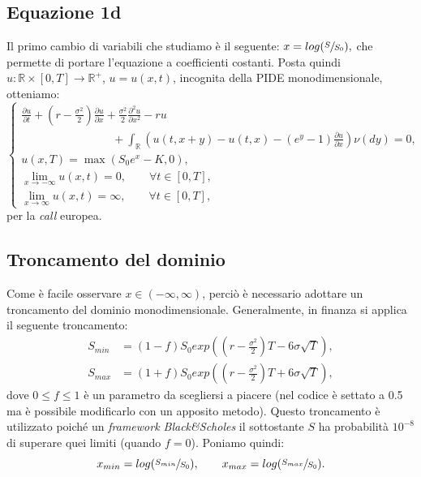 \documentclass[a4paper,10pt]{report}
\newcommand{\der}[2]{\frac{\partial #1}{\partial #2}}
\newcommand{\dder}[2]{\frac{\partial^2 #1}{\partial #2^2}}
\theoremstyle{plain}
\theoremstyle{definition}
\theoremstyle{remark}
\begin{document}
\subsection{Equazione 1d}
Il primo cambio di variabili che studiamo \`e il seguente: $x=log(\sfrac{S}{S_0}),$ che permette di portare l'equazione a coefficienti costanti. Posta quindi $u: \mathbb{R}\times[0,T]\rightarrow\mathbb{R}^+$, $u=u(x,t)$, incognita della PIDE monodimensionale, otteniamo:
\begin{equation}
\label{eq:pide1dlog}
\begin{cases}
\displaystyle
\der{u}{t}+\left(r-\frac{\sigma^2}{2}\right)\der{u}{x}+\frac{\sigma^2}{2}\dder{u}{x}-ru\\
\displaystyle
\qquad\qquad\qquad\qquad+\int_\mathbb{R}\left( u(t,x+y)-u(t,x)-(e^y-1)\der{u}{x}\right)\nu(dy)=0,\\
u(x,T)=\max(S_0e^x-K,0),\\
\lim\limits_{x\to-\infty}u(x,t)=0,\qquad\forall t\in[0,T],\\
\lim\limits_{x\to\infty}u(x,t)=\infty,\qquad\forall t\in[0,T],
\end{cases}
\end{equation}
per la \emph{call} europea.
\subsection{Troncamento del dominio}
Come \`e facile osservare $x\in(-\infty,\infty)$, perci\`o \`e necessario adottare un troncamento del dominio monodimensionale. Generalmente, in finanza si applica il seguente troncamento:
\begin{align}
S_{min}&=(1-f)S_0exp\left( \left(r-\frac{\sigma^2}{2}\right)T-6\sigma\sqrt{T}\right),\\
S_{max}&=(1+f)S_0exp\left( \left(r-\frac{\sigma^2}{2}\right)T+6\sigma\sqrt{T}\right), \nonumber
\label{cut}
\end{align}
dove $0\leq f\leq1$ \`e un parametro da scegliersi a piacere (nel codice \`e settato a 0.5 ma \`e possibile modificarlo con un apposito metodo). Questo troncamento \`e utilizzato poich\'e un \emph{framework Black\&Scholes} il sottostante $S$ ha probabilit\`a $10^{-8}$ di superare quei limiti (quando $f=0$). Poniamo quindi: $$x_{min}=log(\sfrac{S_{min}}{S_0}), \qquad x_{max}=log(\sfrac{S_{max}}{S_0}).$$
\end{document}
